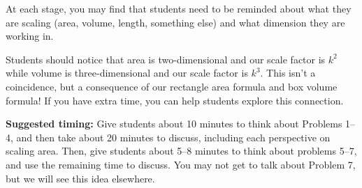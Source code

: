 \documentclass[nooutcomes,noauthor, handout]{ximera}
\begin{document}
\begin{instructorNotes}
At each stage, you may find that students need to be reminded about what they are scaling (area, volume, length, something else) and what dimension they are working in.

Students should notice that area is two-dimensional and our scale factor is $k^2$ while volume is three-dimensional and our scale factor is $k^3$. This isn't a coincidence, but a consequence of our rectangle area formula and box volume formula! If you have extra time, you can help students explore this connection.



{\bf Suggested timing:} Give students about 10 minutes to think about Problems 1--4, and then take about 20 minutes to discuss, including each perspective on scaling area. Then, give students about 5--8 minutes to think about problems 5--7, and use the remaining time to discuss. You may not get to talk about Problem 7, but we will see this idea elsewhere.





\end{instructorNotes}
\end{document}
